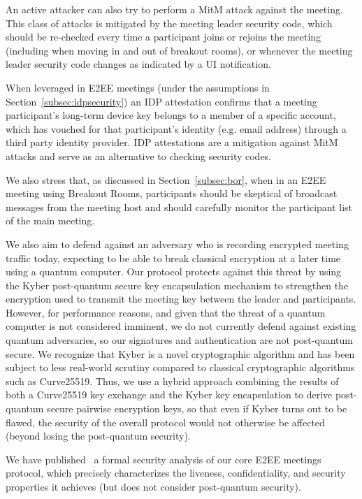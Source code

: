 An active attacker can also try to perform a MitM attack against the meeting. This class of attacks
is mitigated by the meeting leader security code, which should be re-checked every time a
participant joins or rejoins the meeting (including when moving in and out of breakout rooms), or
whenever the meeting leader security code changes as indicated by a UI notification.

When leveraged in E2EE meetings (under the assumptions in Section~\ref{subsec:idpsecurity}) an IDP
attestation confirms that a meeting participant's long-term device key belongs to a member of a specific account, which has vouched for that participant's identity (e.g. email address) through a third party identity provider. IDP attestations are a mitigation against MitM attacks and serve as an alternative to checking security codes.

We also stress that, as discussed in Section~\ref{subsec:bor}, when in an E2EE meeting using Breakout
Rooms, participants should be skeptical of broadcast messages from the meeting host and should
carefully monitor the participant list of the main meeting.

We also aim to defend against an adversary who is recording encrypted meeting traffic today, expecting to be able to break classical encryption at a later time using a quantum computer. Our protocol protects against this threat by using the Kyber post-quantum secure key encapsulation mechanism to strengthen the encryption used to transmit the meeting key between the leader and participants. However, for performance reasons, and given that the threat of a quantum computer is not considered imminent, we do not currently defend against existing quantum adversaries, so our signatures and authentication are not post-quantum secure. We recognize that Kyber is a novel cryptographic algorithm and has been subject to less real-world scrutiny compared to classical cryptographic algorithms such as Curve25519. Thus, we use a hybrid approach combining the results of both a Curve25519 key exchange and the Kyber key encapsulation to derive post-quantum secure pairwise encryption keys, so that even if Kyber turns out to be flawed, the security of the overall protocol would not otherwise be affected (beyond losing the post-quantum security).

We have published~\cite{eurocrypt-2023-32928} a formal security analysis of our core E2EE meetings protocol,
which precisely characterizes the liveness, confidentiality, and security properties it achieves (but does not consider post-quantum security).

